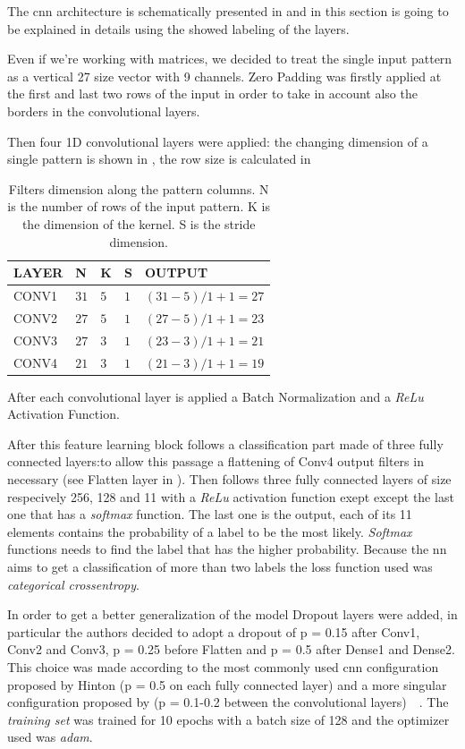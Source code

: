 The \gls{cnn} architecture is schematically presented in  and in this section is going to be explained in details using the showed labeling of the layers.

Even if we're working with matrices, we decided to treat the single input pattern as a vertical 27 size vector with 9 channels. Zero Padding was firstly applied at the first and last two rows of the input in order to take in account also the borders in the convolutional layers.

Then four 1D convolutional layers were applied: the changing dimension of a single pattern is shown in , the row size is calculated in 

\begin{table}[htp]
\small
	\centering
		\renewcommand{\arraystretch}{1}%
	\begin{tabular}{@{}lllll@{}}
	\toprule
	LAYER & N & K & S & OUTPUT\\
	\midrule
	CONV1 & $31$ & $5$ & $1$ & $(31-5)/1+1 = 27$\\
	CONV2 & $27$ & $5$ & $1$ & $(27-5)/1+1 = 23$\\
	CONV3 & $27$ & $3$ & $1$ & $(23-3)/1+1 = 21$\\
	CONV4 & $21$ & $3$ & $1$ & $(21-3)/1+1 = 19$\\
	\bottomrule
	\end{tabular}
	\caption{Filters dimension along the pattern columns. N is the number of rows of the input pattern. K is the dimension of the kernel. S is the stride dimension.}
	\label{tab:filtersize}
\end{table}

After each convolutional layer is applied a Batch Normalization and a \textit{ReLu} Activation Function.

After this feature learning block follows a classification part made of three fully connected layers:to allow this passage a flattening of Conv4 output filters in necessary (see Flatten layer in ). Then follows three fully connected layers of size respecively 256, 128 and 11 with a \textit{ReLu} activation function exept except the last one that has a \textit{softmax} function. The last one is the output, each of its 11 elements contains the probability of a label to be the most likely. \textit{Softmax} functions needs to find the label that has the higher probability. Because the \gls{nn} aims to get a classification of more than two labels the loss function used was \textit{categorical crossentropy}.

In order to get a better generalization of the model Dropout layers were added, in particular the authors decided to adopt a dropout of p = 0.15 after Conv1, Conv2 and Conv3, p = 0.25 before Flatten and p = 0.5 after Dense1 and Dense2. This choice was made according to the most commonly used \gls{cnn} configuration proposed by Hinton (p = 0.5 on each fully connected layer) and a more singular configuration proposed by  (p = 0.1-0.2 between the convolutional layers)~\cite{Hinton12}~\cite{Sungheon17}.
The \textit{training set} was trained for 10 epochs with a batch size of 128 and the optimizer used was \textit{adam}.
